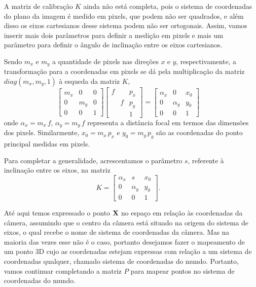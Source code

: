 A matriz de calibração $K$ ainda não está completa, pois o sistema de coordenadas do plano da imagem é medido em pixels, que podem não ser quadrados, e além disso os eixos cartesianos desse sistema podem não ser ortogonais. Assim, vamos inserir mais dois parâmetros para definir a medição em pixels e mais um parâmetro para definir o ângulo de inclinação entre os eixos cartesianos.

Sendo $m_x$ e $m_y$ a quantidade de pixels nas direções $x$ e $y$, respectivamente, a transformação para a coordenadas em pixels se dá pela multiplicação da matriz $diag(m_x,m_y,1)$ à esqueda da matriz $K$,
\begin{equation*}
\begin{bmatrix}
m_x&0&0\\
0&m_y&0\\
0&0&1
\end{bmatrix}      
\begin{bmatrix}
f& &p_x\\
&f&p_y\\
& &1
\end{bmatrix}
=
\begin{bmatrix}
\alpha_x&0&x_0\\
0&\alpha_y&y_0\\
0&0&1
\end{bmatrix}
\end{equation*}
onde $\alpha_x=m_x\,f$, $\alpha_y=m_y\,f$ representa a distância focal em termos das dimensões dos pixels. Similarmente, $x_0=m_x\,p_x$ e $y_0=m_y\,p_y$ são as coordenadas do ponto principal medidas em pixels.

Para completar a generalidade, acrescentamos o parâmetro $s$, referente à inclinação entre os eixos, na matriz
\begin{equation*}
K=
\begin{bmatrix}
\alpha_x&s&x_0\\
0&\alpha_y&y_0\\
0&0&1
\end{bmatrix}.
\end{equation*}






Até aqui temos expressado o ponto $\mathbf{X}$ no espaço em relação às coordenadas da câmera, assumindo que o centro da câmera está situado na origem do sistema de eixos, o qual recebe o nome de sistema de coordenadas da câmera. Mas na maioria das vezes esse não é o caso, portanto desejamos fazer o mapeamento de um ponto 3D cujo as coordenadas estejam expressas com relação a um sistema de coordenadas qualquer, chamado sistema de coordenadas do mundo. Portanto, vamos continuar completando a matriz $P$ para mapear pontos no sistema de coordenadas do mundo.

